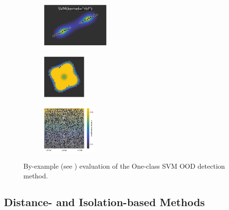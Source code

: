 \begin{figure}[H]
    \centering
    \begin{subfigure}
        \centering
        \includegraphics[width=0.388\textwidth,valign=t]{ood-detection/figures/ood-detection/confidence-line-svm-rbf.pdf}
    \end{subfigure}
    \begin{subfigure}
        \centering
        \includegraphics[width=0.254\textwidth,valign=t]{ood-detection/figures/ood-detection/confidence-circle-svm-rbf.pdf}
    \end{subfigure}
    \begin{subfigure}
        \centering
        \includegraphics[width=0.308\textwidth,valign=t]{ood-detection/figures/ood-detection/confidence-haystack-svm-rbf.pdf}
    \end{subfigure}

    \caption[The One-class SVM OOD detection method]{By-example (see ) evaluation of the One-class SVM \cite{ood-svm-1999} OOD detection method.}
    \label{fig:one-class-ood-detection}
\end{figure}

\subsection{Distance- and Isolation-based Methods}

